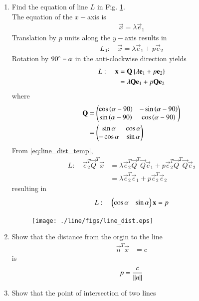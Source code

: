 \begin{enumerate}[label=\arabic*.,ref=\thesubsection.\theenumi]
%
\item Find the equation of  line $L$ in Fig. \ref{fig:line_dist}.
\\
\solution The equation of the $x-$axis is
\begin{align}
\vec{x} =\lambda \vec{e}_1
\end{align}
Translation by $p$ units along the $y-$axis results in 
\begin{align}
L_0: \quad \vec{x} = \lambda \vec{e}_1 + p \vec{e}_2 
\end{align}
Rotation by $90\degree-\alpha$ in the anti-clockwise direction yields
\begin{align}
L: \quad \mathbf{x} &= \mathbf{Q}\left\{\lambda \mathbf{e}_1 + p \mathbf{e}_2 \right\}
\\
&=\lambda \mathbf{Q}\mathbf{e}_1 + p \mathbf{Q}\mathbf{e}_2 
\label{eq:line_dist_temp}
\end{align}
%
where 
\begin{align}
\mathbf{Q} &= \begin{pmatrix}\cos \left(\alpha-90\right) & -\sin \left(\alpha-90\right)\\ \sin \left(\alpha-90\right) & \cos \left(\alpha-90\right)\end{pmatrix}
\\
&= \begin{pmatrix}\sin \alpha & \cos \alpha \\ -\cos \alpha & \sin \alpha\end{pmatrix}
\end{align}
%
From \eqref{eq:line_dist_temp},
\begin{align}
L: \quad \vec{e}_2^T\vec{Q}^T\vec{x}&=\lambda \vec{e}_2^T\vec{Q}^T\vec{Q}\vec{e}_1 + p \vec{e}_2^T\vec{Q}^T\vec{Q}\vec{e}_2 
\nonumber \\
&=\lambda \vec{e}_2^T\vec{e}_1 + p \vec{e}_2^T\vec{e}_2 
\end{align}
resulting in 
\begin{align}
L: \quad \begin{pmatrix}\cos \alpha & \sin \alpha\end{pmatrix}\mathbf{x}=p
\label{eq:line_dist_temp_final}
\end{align}
\begin{figure}
\centering
\texttt{[image: ./line/figs/line\_dist.eps]}
\caption{}
\label{fig:line_dist}
\end{figure}
\item Show that the distance from the orgin to the line 
\begin{align}
\vec{n}^T\vec{x} &=c
\end{align}
is 
\begin{align}
p = \frac{c}{\left\lVert n\right\rVert}
\label{eq:line_dist_orig}
\end{align}
\item Show that the point of intersection of two lines 

\end{enumerate}
